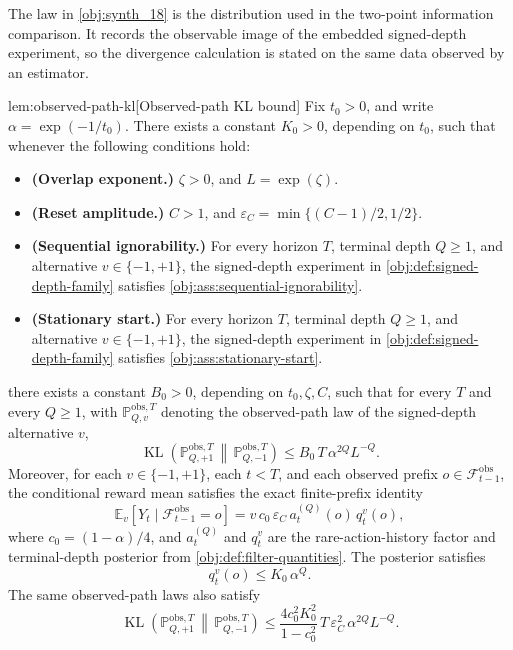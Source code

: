 \documentclass[11pt]{article}
\begin{document}
The law in \cref{obj:synth_18} is the distribution used in the two-point information comparison. It records the observable image of the embedded signed-depth experiment, so the divergence calculation is stated on the same data observed by an estimator.

\begin{lemmav}{lem:observed-path-kl}[Observed-path KL bound]
Fix \(t_0>0\), and write \(\alpha=\exp(-1/t_0)\). There exists a constant \(K_0>0\), depending on \(t_0\), such that whenever the following conditions hold:
\begin{itemize}
\item \textbf{(Overlap exponent.)} \(\zeta>0\), and \(L=\exp(\zeta)\).
\item \textbf{(Reset amplitude.)} \(C>1\), and \(\varepsilon_C=\min\{(C-1)/2,1/2\}\).
\item \textbf{(Sequential ignorability.)} For every horizon \(T\), terminal depth \(Q\ge 1\), and alternative \(v\in\{-1,+1\}\), the signed-depth experiment in \cref{obj:def:signed-depth-family} satisfies \cref{obj:ass:sequential-ignorability}.
\item \textbf{(Stationary start.)} For every horizon \(T\), terminal depth \(Q\ge 1\), and alternative \(v\in\{-1,+1\}\), the signed-depth experiment in \cref{obj:def:signed-depth-family} satisfies \cref{obj:ass:stationary-start}.
\end{itemize}
there exists a constant \(B_0>0\), depending on \(t_0,\zeta,C\), such that for every \(T\) and every \(Q\ge 1\), with \(\mathbb P_{Q,v}^{\mathrm{obs},T}\) denoting the observed-path law of the signed-depth alternative \(v\),
\[
\operatorname{KL}\!\left(\mathbb P_{Q,+1}^{\mathrm{obs},T}\,\middle\|\,\mathbb P_{Q,-1}^{\mathrm{obs},T}\right)
\le
B_0\,T\,\alpha^{2Q}L^{-Q}.
\]
Moreover, for each \(v\in\{-1,+1\}\), each \(t<T\), and each observed prefix \(o\in\mathcal F_{t-1}^{\mathrm{obs}}\), the conditional reward mean satisfies the exact finite-prefix identity
\[
\mathbb E_v[Y_t\mid \mathcal F_{t-1}^{\mathrm{obs}}=o]
=
v\,c_0\,\varepsilon_C\,a_t^{(Q)}(o)\,q_t^v(o),
\]
where \(c_0=(1-\alpha)/4\), and \(a_t^{(Q)}\) and \(q_t^v\) are the rare-action-history factor and terminal-depth posterior from \cref{obj:def:filter-quantities}. The posterior satisfies
\[
q_t^v(o)\le K_0\,\alpha^Q .
\]
The same observed-path laws also satisfy
\[
\operatorname{KL}\!\left(\mathbb P_{Q,+1}^{\mathrm{obs},T}\,\middle\|\,\mathbb P_{Q,-1}^{\mathrm{obs},T}\right)
\le
\frac{4c_0^2K_0^2}{1-c_0^2}\,
T\,\varepsilon_C^2\,\alpha^{2Q}L^{-Q}.
\]
\end{lemmav}
\end{document}
